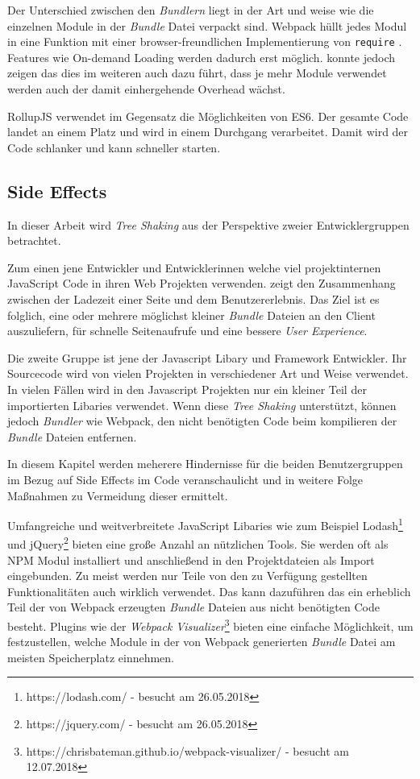 Der Unterschied zwischen den \textit{Bundlern} liegt in der Art und weise wie die einzelnen Module in der \textit{Bundle} Datei verpackt sind. Webpack hüllt jedes Modul in eine Funktion mit einer browser-freundlichen Implementierung von \lstinline{require} \autocite{RichHarris}. Features wie On-demand Loading werden dadurch erst möglich. \textcite{NolanLawson} konnte jedoch zeigen das dies im weiteren auch dazu führt, dass je mehr Module verwendet werden auch der damit einhergehende Overhead wächst.

RollupJS verwendet im Gegensatz die Möglichkeiten von ES6. Der gesamte Code landet an einem Platz und wird in einem Durchgang verarbeitet. Damit wird der Code schlanker und kann schneller starten. \autocite{RichHarris}

\subsection{Side Effects}
\label{subsection:side_effects}
In dieser Arbeit wird \textit{Tree Shaking} aus der Perspektive zweier Entwicklergruppen betrachtet. 

Zum einen jene Entwickler und Entwicklerinnen welche viel projektinternen JavaScript Code in ihren Web Projekten verwenden. \textcite{Nielson1997} zeigt den Zusammenhang zwischen der Ladezeit einer Seite und dem Benutzererlebnis. Das Ziel ist es folglich, eine oder mehrere möglichst kleiner \textit{Bundle} Dateien an den Client auszuliefern, für schnelle Seitenaufrufe und eine bessere \textit{User Experience}.

Die zweite Gruppe ist jene der Javascript Libary und Framework Entwickler. Ihr Sourcecode wird von vielen Projekten in verschiedener Art und Weise verwendet. In vielen Fällen wird in den Javascript Projekten nur ein kleiner Teil der importierten Libaries verwendet. Wenn diese \textit{Tree Shaking} unterstützt, können jedoch \textit{Bundler} wie Webpack, den nicht benötigten Code beim kompilieren der \textit{Bundle} Dateien entfernen.

In diesem Kapitel werden meherere Hindernisse für die beiden Benutzergruppen im Bezug auf Side Effects im Code veranschaulicht und in weitere Folge Maßnahmen zu Vermeidung dieser ermittelt. 

Umfangreiche und weitverbreitete JavaScript Libaries wie zum Beispiel Lodash\footnote{https://lodash.com/ - besucht am 26.05.2018} und jQuery\footnote{https://jquery.com/ - besucht am 26.05.2018} bieten eine große Anzahl an nützlichen Tools. Sie werden oft als NPM Modul installiert und anschließend in den Projektdateien als Import eingebunden. Zu meist werden nur Teile von den zu Verfügung gestellten Funktionalitäten auch wirklich verwendet. Das kann dazuführen das ein erheblich Teil der von Webpack erzeugten \textit{Bundle} Dateien aus nicht benötigten Code besteht. Plugins wie der \textit{Webpack Visualizer}\footnote{https://chrisbateman.github.io/webpack-visualizer/ - besucht am 12.07.2018} bieten eine einfache Möglichkeit, um festzustellen, welche Module in der von Webpack generierten \textit{Bundle} Datei am meisten Speicherplatz einnehmen.


